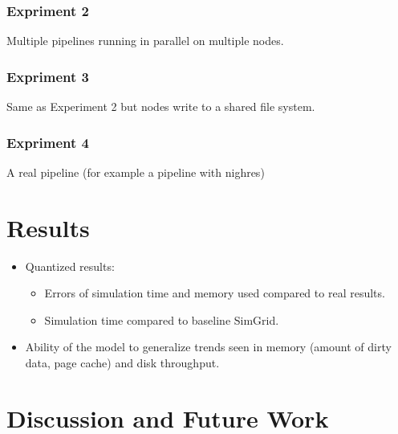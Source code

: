 \documentclass[conference]{IEEEtran}
\begin{document}
			\subsubsection{Expriment 2}
				Multiple pipelines running in parallel on multiple nodes.
			\subsubsection{Expriment 3}
				Same as Experiment 2 but nodes write to a shared file system.
			\subsubsection{Expriment 4}
				A real pipeline (for example a pipeline with nighres)

	\section{Results}
	
		\begin{itemize}

			\item Quantized results: 
				\begin{itemize}
					\item Errors of simulation time and memory used compared to real results.
					\item Simulation time compared to baseline SimGrid.
				\end{itemize} 

			\item Ability of the model to generalize trends seen in memory (amount of dirty data, page cache) and disk throughput.

		\end{itemize}

	\section{Discussion and Future Work}
\end{document}
